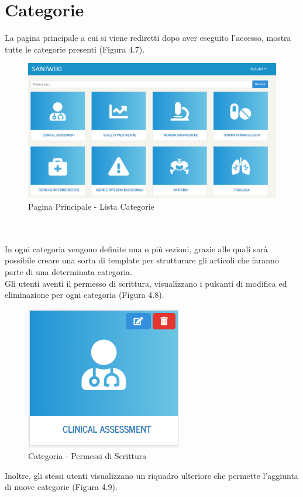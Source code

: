 \documentclass[twoside]{supsistudent}
\begin{document}
\section{Categorie}
La pagina principale a cui si viene rediretti dopo aver eseguito l'accesso, mostra tutte le categorie presenti (Figura 4.7).\\
\begin{figure}[!h]
\centering
\includegraphics[scale=0.4]{saniwiki_categorie.png}
\caption{Pagina Principale - Lista Categorie}
\end{figure}
\\\\
In ogni categoria vengono definite una o più sezioni, grazie alle quali sarà possibile creare una sorta di template per strutturare gli articoli che faranno parte di una determinata categoria.\\
Gli utenti aventi il permesso di scrittura, visualizzano i pulsanti di modifica ed eliminazione per ogni categoria (Figura 4.8).
\begin{figure}[!h]
\centering
\includegraphics[scale=0.6]{saniwiki_modificaeliminacategoria.png}
\caption{Categoria - Permessi di Scrittura}
\end{figure}
Inoltre, gli stessi utenti visualizzano un riquadro ulteriore che permette l'aggiunta di nuove categorie (Figura 4.9).\\ \\ \\ \\ \\ \\
\end{document}
